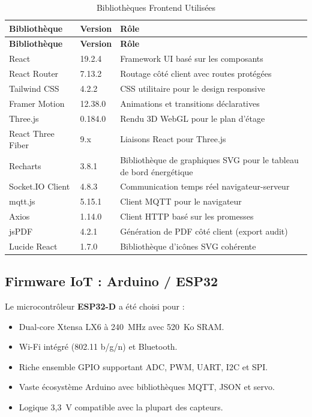 \begin{center}
\begin{longtable}{p{} p{} p{}}
\caption{Bibliothèques Frontend Utilisées}\label{tab:frontend_stack}\\
\toprule
\textbf{Bibliothèque} & \textbf{Version} & \textbf{Rôle} \\
\midrule
\endfirsthead
\toprule
\textbf{Bibliothèque} & \textbf{Version} & \textbf{Rôle} \\
\midrule
\endhead
\bottomrule
\endfoot
React               & 19.2.4  & Framework UI basé sur les composants \\
React Router        & 7.13.2  & Routage côté client avec routes protégées \\
Tailwind CSS        & 4.2.2   & CSS utilitaire pour le design responsive \\
Framer Motion       & 12.38.0 & Animations et transitions déclaratives \\
Three.js            & 0.184.0 & Rendu 3D WebGL pour le plan d'étage \\
React Three Fiber   & 9.x     & Liaisons React pour Three.js \\
Recharts            & 3.8.1   & Bibliothèque de graphiques SVG pour le tableau de bord énergétique \\
Socket.IO Client    & 4.8.3   & Communication temps réel navigateur-serveur \\
mqtt.js             & 5.15.1  & Client MQTT pour le navigateur \\
Axios               & 1.14.0  & Client HTTP basé sur les promesses \\
jsPDF               & 4.2.1   & Génération de PDF côté client (export audit) \\
Lucide React        & 1.7.0   & Bibliothèque d'icônes SVG cohérente \\
\end{longtable}
\end{center}

\subsection{Firmware IoT : Arduino / ESP32}

Le microcontrôleur \textbf{ESP32-D} a été choisi pour :
\begin{itemize}[leftmargin=1.5cm,itemsep=4pt]
  \item Dual-core Xtensa LX6 à 240~MHz avec 520~Ko SRAM.
  \item Wi-Fi intégré (802.11 b/g/n) et Bluetooth.
  \item Riche ensemble GPIO supportant ADC, PWM, UART, I2C et SPI.
  \item Vaste écosystème Arduino avec bibliothèques MQTT, JSON et servo.
  \item Logique 3,3~V compatible avec la plupart des capteurs.
\end{itemize}


